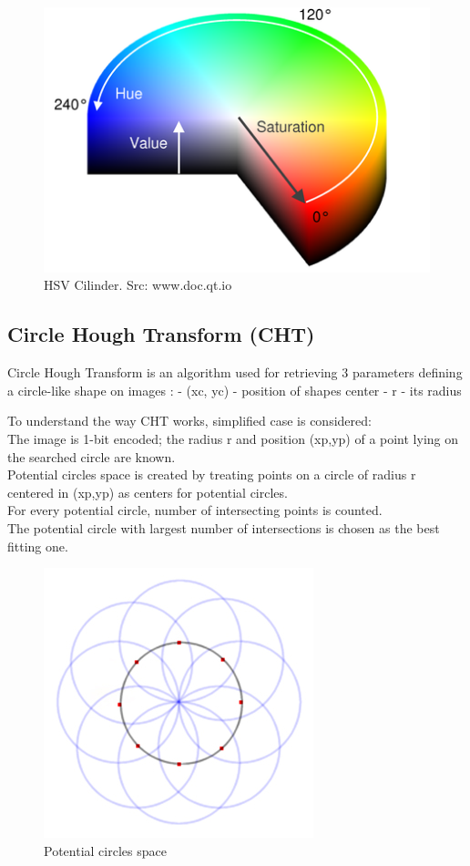\documentclass[12pt,twoside,a4paper]{article}
\begin{document}
\begin{figure}[H]
\centering
\includegraphics[width=0.4\paperwidth]{hsv}
\caption{HSV Cilinder. Src: www.doc.qt.io}
\end{figure}


\subsection{Circle Hough Transform (CHT)}
Circle Hough Transform is an algorithm used for retrieving 3 parameters defining a circle-like shape on images\cite{hgtcv} : 
- (xc, yc) - position of shapes center
- r - its radius

To understand the way CHT works, simplified case is considered:\\
The image is 1-bit encoded; the radius r and position (xp,yp) of a point lying on the searched circle are known.\\
Potential circles space is created by treating points on a circle of radius r centered in (xp,yp) as centers for potential circles.\\
For every potential circle, number of intersecting points is counted.\\
The potential circle with largest number of intersections is chosen as the best fitting one.

 
\begin{figure}[H]
\centering
\includegraphics[width=0.4\paperwidth]{space}
\caption{Potential circles space\cite{craters}}
\end{figure}
\end{document}
